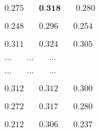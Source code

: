 \newsavebox\embeddiobFoote
\begin{lrbox}{\embeddiobFoote}
   $\begin{aligned}
     0.275 & \quad \textbf{0.318} & \quad 0.280
    \end{aligned} $
\end{lrbox}

\newsavebox\embeddiobCNMF
\begin{lrbox}{\embeddiobCNMF}
   $\begin{aligned}
     0.248 & \quad 0.296 & \quad 0.254
    \end{aligned} $
\end{lrbox}

\newsavebox\pcpSF
\begin{lrbox}{\pcpSF}
   $\begin{aligned}
     0.311 & \quad 0.324 & \quad 0.305
    \end{aligned} $
\end{lrbox}

\newsavebox\pcpFoote
\begin{lrbox}{\pcpFoote}
   $\begin{aligned}
     ... & \quad ... & \quad ...
    \end{aligned} $
\end{lrbox}

\newsavebox\pcpCNMF
\begin{lrbox}{\pcpCNMF}
   $\begin{aligned}
     ... & \quad ... & \quad ...
    \end{aligned} $
\end{lrbox}

\newsavebox\tonnetzSF
\begin{lrbox}{\tonnetzSF}
   $\begin{aligned}
     0.312 & \quad 0.312 & \quad 0.300
    \end{aligned} $
\end{lrbox}

\newsavebox\tonnetzFoote
\begin{lrbox}{\tonnetzFoote}
   $\begin{aligned}
     0.272 & \quad 0.317 & \quad 0.280
    \end{aligned} $
\end{lrbox}

\newsavebox\tonnetzCNMF
\begin{lrbox}{\tonnetzCNMF}
   $\begin{aligned}
     0.212 & \quad 0.306 & \quad 0.237
    \end{aligned} $
\end{lrbox}

